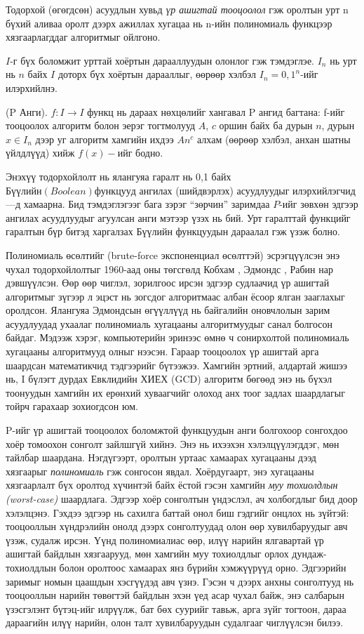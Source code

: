 Тодорхой (өгөгдсөн) асуудлын хувьд \textit{үр ашигтай тооцоолол} гэж оролтын урт n бүхий аливаа оролт дээрх ажиллах хугацаа нь n-ийн полиномиаль функцээр хязгаарлагддаг алгоритмыг ойлгоно.


$I$-г бүх боломжит урттай хоёртын дарааллуудын олонлог гэж тэмдэглэе. $I_n$ нь урт нь $n$ байх $I$ доторх бүх хоёртын дарааллыг, өөрөөр хэлбэл $I_n = {0,1}^n$-ийг илэрхийлнэ.


\begin{definition}
  (P Анги). $f : I \rightarrow I$ функц нь дараах нөхцөлийг хангавал P ангид багтана: f-ийг тооцоолох алгоритм болон эерэг тогтмолууд $A$, $c$ оршин байх ба дурын $n$, дурын $x \in I_n$ дээр уг алгоритм хамгийн ихдээ $An^c$ алхам (өөрөөр хэлбэл, анхан шатны үйлдлүүд) хийж $f(x)-ийг$ бодно.
\end{definition}


Энэхүү тодорхойлолт нь ялангуяа гаралт нь {0,1} байх $Бүүлийн (Boolean) функцууд$ ангилах (шийдвэрлэх) асуудлуудыг илэрхийлэгчид—д хамаарна. Бид тэмдэглэгээг бага зэрэг “зөрчин” заримдаа $P$-ийг зөвхөн эдгээр ангилах асуудлуудыг агуулсан анги мэтээр үзэх нь бий. Урт гаралттай функцийг гаралтын бүр битэд харгалзах Бүүлийн функцуудын дараалал гэж үзэж болно.


Полиномиаль өсөлтийг (brute-force экспоненциал өсөлттэй) эсрэгцүүлсэн энэ чухал тодорхойлолтыг 1960-аад оны төгсгөлд Кобхам \cite{Cob65}, Эдмондс \cite{Edm65b, Edm66, Edm67a}, Рабин \cite{Rab67} нар дэвшүүлсэн. Өөр өөр чиглэл, зорилгоос ирсэн эдгээр судлаачид үр ашигтай алгоритмыг зүгээр л эцэст нь зогсдог алгоритмаас албан ёсоор ялган зааглахыг оролдсон. Ялангуяа Эдмондсын өгүүллүүд нь байгалийн оновчлолын зарим асуудлуудад ухаалаг полиномиаль хугацааны алгоритмуудыг санал болгосон байдаг. Мэдээж хэрэг, компьютерийн эринээс өмнө ч сонирхолтой полиномиаль хугацааны алгоритмууд олныг нээсэн. Гараар тооцоолох үр ашигтай арга шаардсан математикчид тэдгээрийг бүтээжээ. Хамгийн эртний, алдартай жишээ нь, I бүлэгт дурдах Евклидийн ХИЕХ (GCD) алгоритм бөгөөд энэ нь бүхэл тоонуудын хамгийн их ерөнхий хуваагчийг олоход анх тоог задлах шаардлагыг тойрч гарахаар зохиогдсон юм.


P-ийг үр ашигтай тооцоолох боломжтой функцуудын анги болгохоор сонгохдоо хоёр томоохон сонголт зайлшгүй хийнэ. Энэ нь ихээхэн хэлэлцүүлэгддэг, мөн тайлбар шаардана. Нэгдүгээрт, оролтын уртаас хамаарах хугацааны дээд хязгаарыг \textit{полиномиаль} гэж сонгосон явдал. Хоёрдугаарт, энэ хугацааны хязгаарлалт бүх оролтод хүчинтэй байх ёстой гэсэн хамгийн \textit{муу тохиолдлын (worst-case)} шаардлага. Эдгээр хоёр сонголтын үндэслэл, ач холбогдлыг бид доор хэлэлцэнэ. Гэхдээ эдгээр нь сахилга баттай онол биш гэдгийг онцлох нь зүйтэй: тооцооллын хүндрэлийн онолд дээрх сонголтуудад олон өөр хувилбаруудыг авч үзэж, судалж ирсэн. Үүнд полиномиалиас өөр, илүү нарийн ялгавартай үр ашигтай байдлын хязгаарууд, мөн хамгийн муу тохиолдлыг орлох дундаж-тохиолдлын болон оролтоос хамаарах янз бүрийн хэмжүүрүүд орно. Эдгээрийн заримыг номын цаашдын хэсгүүдэд авч үзнэ. Гэсэн ч дээрх анхны сонголтууд нь тооцооллын нарийн төвөгтэй байдлын эхэн үед асар чухал байж, энэ салбарын үзэсгэлэнт бүтэц-ийг илрүүлж, бат бөх суурийг тавьж, арга зүйг тогтоон, дараа дараагийн илүү нарийн, олон талт хувилбаруудын судалгааг чиглүүлсэн билээ.


